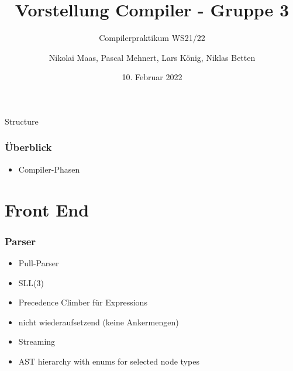 \documentclass[navbaroff,en]{sdqbeamer}
\title{Vorstellung Compiler - Gruppe 3}
\subtitle{Compilerpraktikum WS21/22}
\author[Nikolai, Pascal, Lars, Niklas]{Nikolai Maas, Pascal Mehnert, Lars König, Niklas Betten}
\date[10.\,2.\,2022]{10. Februar 2022}
\begin{document}
\KITtitleframe

\begin{frame}{Structure}
\tableofcontents
\end{frame}

\begin{frame}
    \frametitle{Überblick}

    \begin{itemize}
        \item Compiler-Phasen
    \end{itemize}

\end{frame}


\section{Front End}

\begin{frame}
	\frametitle{Parser}

    \begin{itemize}
        \item Pull-Parser
        \item SLL(3)
        \item Precedence Climber für Expressions
        \item nicht wiederaufsetzend (keine Ankermengen)
        \item Streaming
        \item AST hierarchy with enums for selected node types
    \end{itemize}

\end{frame}
\end{document}
